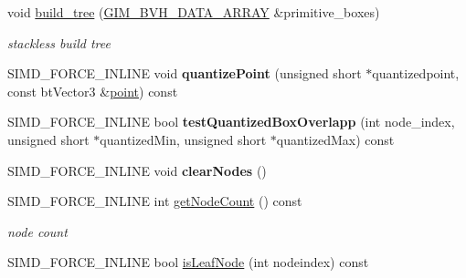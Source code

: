 \begin{DoxyCompactItemize}
\item 
void \hyperlink{classbt_quantized_bvh_tree_aa2229fd3e3e2004cdf8151437535e936}{build\+\_\+tree} (\hyperlink{class_g_i_m___b_v_h___d_a_t_a___a_r_r_a_y}{G\+I\+M\+\_\+\+B\+V\+H\+\_\+\+D\+A\+T\+A\+\_\+\+A\+R\+R\+A\+Y} \&primitive\+\_\+boxes)
\begin{DoxyCompactList}\small\item\em stackless build tree \end{DoxyCompactList}\item 
\hypertarget{classbt_quantized_bvh_tree_a26648de243e317c8b4399d04c763edee}{S\+I\+M\+D\+\_\+\+F\+O\+R\+C\+E\+\_\+\+I\+N\+L\+I\+N\+E void {\bfseries quantize\+Point} (unsigned short $\ast$quantizedpoint, const bt\+Vector3 \&\hyperlink{structpoint}{point}) const }\label{classbt_quantized_bvh_tree_a26648de243e317c8b4399d04c763edee}

\item 
\hypertarget{classbt_quantized_bvh_tree_a9f6c3be722fa73a6907970f1ed99b731}{S\+I\+M\+D\+\_\+\+F\+O\+R\+C\+E\+\_\+\+I\+N\+L\+I\+N\+E bool {\bfseries test\+Quantized\+Box\+Overlapp} (int node\+\_\+index, unsigned short $\ast$quantized\+Min, unsigned short $\ast$quantized\+Max) const }\label{classbt_quantized_bvh_tree_a9f6c3be722fa73a6907970f1ed99b731}

\item 
\hypertarget{classbt_quantized_bvh_tree_a893b44b85db31fc25346bcd20659bf64}{S\+I\+M\+D\+\_\+\+F\+O\+R\+C\+E\+\_\+\+I\+N\+L\+I\+N\+E void {\bfseries clear\+Nodes} ()}\label{classbt_quantized_bvh_tree_a893b44b85db31fc25346bcd20659bf64}

\item 
\hypertarget{classbt_quantized_bvh_tree_a8f8b4acde8a974cb57d9d19b37009100}{S\+I\+M\+D\+\_\+\+F\+O\+R\+C\+E\+\_\+\+I\+N\+L\+I\+N\+E int \hyperlink{classbt_quantized_bvh_tree_a8f8b4acde8a974cb57d9d19b37009100}{get\+Node\+Count} () const }\label{classbt_quantized_bvh_tree_a8f8b4acde8a974cb57d9d19b37009100}

\begin{DoxyCompactList}\small\item\em node count \end{DoxyCompactList}\item 
\hypertarget{classbt_quantized_bvh_tree_a004ff2bf4b2ef3d80d0e01a2ab249e5d}{S\+I\+M\+D\+\_\+\+F\+O\+R\+C\+E\+\_\+\+I\+N\+L\+I\+N\+E bool \hyperlink{classbt_quantized_bvh_tree_a004ff2bf4b2ef3d80d0e01a2ab249e5d}{is\+Leaf\+Node} (int nodeindex) const }\label{classbt_quantized_bvh_tree_a004ff2bf4b2ef3d80d0e01a2ab249e5d}


\end{DoxyCompactItemize}
